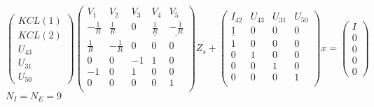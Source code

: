 \[\left(\begin{array}{c}
KCL(1)\\KCL(2)\\U_{43}\\U_{31}\\U_{50}
\end{array}\right)
\left(\begin{array}{ccccc}
V_{1}&V_{2}&V_{3}&V_{4}&V_{5}\\
  \hline
  -\frac{1}{R}&\frac{1}{R}&0&\underline{\frac{1}{R}}&\underline{-\frac{1}{R}}\\
  \frac{1}{R}&-\frac{1}{R}&0&0&0\\
  0&0&-1&1&0\\
  -1&0&1&0&0\\
  0&0&0&0&1\\
\end{array}\right)Z_{s}+
\left(\begin{array}{cccc}
  I_{42}&U_{43}&U_{31}&U_{50}\\
  \hline
  \underline{1}&0&0&0\\
  1&0&0&0\\0&1&0&0\\0&0&1&0\\0&0&0&1\\
\end{array}\right)x=
\left(\begin{array}{c}
  I\\0\\0\\0\\0
  \end{array}\right)
\]
$N_{I}=N_{E}=9$
